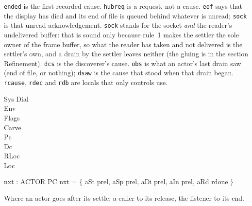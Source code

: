 \documentclass[a4paper,10pt,fleqn]{article}
\begin{document}
\texttt{ended} is the first recorded cause.  \texttt{hubreq} is a request, not a
cause.  \texttt{eof} says that the display has died and its end of file is
queued behind whatever is unread; \texttt{sock} is that unread
acknowledgement.  \texttt{sock} stands for the socket \emph{and} the reader's
undelivered buffer: that is sound only because rule~1 makes the settler the sole
owner of the frame buffer, so what the reader has taken and not delivered is the
settler's own, and a drain by the settler leaves neither (the gluing is in the
section Refinement).  \texttt{dcs} is the discoverer's cause.  \texttt{obs} is
what an actor's last drain saw (end of file, or nothing); \texttt{dsaw} is the
cause that stood when that drain began.  \texttt{rcause}, \texttt{rdec} and
\texttt{rdb} are locals that only controls use.

\begin{schema}{Sys}
  Dial \\ Env \\ Flags \\ Carve \\ Pc \\ Dc \\ RLoc \\ Loc
\end{schema}

\begin{axdef}
  nxt : ACTOR \fun PC
\where
  nxt = \{ aSt \mapsto prel, aSp \mapsto prel, aDi \mapsto prel, aIn \mapsto prel,
    aRd \mapsto rdone \}
\end{axdef}

Where an actor goes after its settle: a caller to its release, the listener to
its end.
\end{document}
